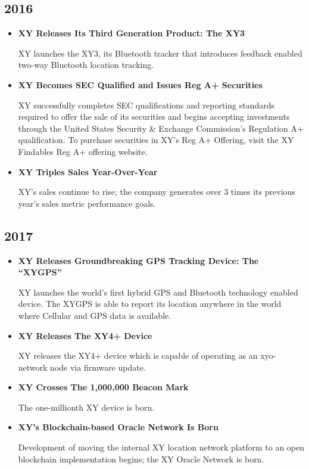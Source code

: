 \documentclass{article}
\begin{document}
\subsection{2016}
\begin{itemize}
\item \textbf{XY Releases Its Third Generation Product: The XY3}

XY launches the XY3, its Bluetooth tracker that introduces feedback enabled two-way Bluetooth location tracking.

\item \textbf{XY Becomes SEC Qualified and Issues Reg A+ Securities}

XY successfully completes SEC qualifications and reporting standards required to offer the sale of its securities and begins accepting investments through the United States Security \& Exchange Commission's Regulation A+ qualification. To purchase securities in XY's Reg A+ Offering, visit the XY Findables Reg A+ offering website.

\item \textbf{XY Triples Sales Year-Over-Year}

XY's sales continue to rise; the company generates over 3 times its previous year's sales metric performance goals.
\end{itemize}

\subsection{2017}
\begin{itemize}
\item \textbf{XY Releases Groundbreaking GPS Tracking Device: The ``XYGPS''}

XY launches the world's first hybrid GPS and Bluetooth technology enabled device. The XYGPS is able to report its location anywhere in the world where Cellular and GPS data is available.

\item \textbf{XY Releases The XY4+ Device}

XY releases the XY4+ device which is capable of operating as an \Gls{xyo-network} node via firmware update.

\item \textbf{XY Crosses The 1,000,000 Beacon Mark}

The one-millionth XY device is born.

\item \textbf{XY's Blockchain-based Oracle Network Is Born}

Development of moving the internal XY location network platform to an open blockchain implementation begins; the XY Oracle Network is born.
\end{itemize}
\end{document}
